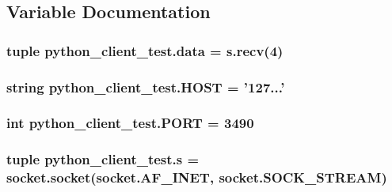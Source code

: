 \subsection{Variable Documentation}
\hypertarget{namespacepython__client__test_a70aa6f62f16d17a2bdf23844fb86b039}{
\subsubsection[{data}]{\setlength{\rightskip}{0pt plus 5cm}tuple python\-\_\-client\-\_\-test.\-data = s.\-recv(4)}}\label{namespacepython__client__test_a70aa6f62f16d17a2bdf23844fb86b039}
\hypertarget{namespacepython__client__test_a92606c7a15210740590acd070e01df55}{
\subsubsection[{H\-O\-S\-T}]{\setlength{\rightskip}{0pt plus 5cm}string python\-\_\-client\-\_\-test.\-H\-O\-S\-T = '127...'}}\label{namespacepython__client__test_a92606c7a15210740590acd070e01df55}
\hypertarget{namespacepython__client__test_ad1345f8ee5062de9e8a7ed7efdf18ac7}{
\subsubsection[{P\-O\-R\-T}]{\setlength{\rightskip}{0pt plus 5cm}int python\-\_\-client\-\_\-test.\-P\-O\-R\-T = 3490}}\label{namespacepython__client__test_ad1345f8ee5062de9e8a7ed7efdf18ac7}
\hypertarget{namespacepython__client__test_afe25ba75e651f13976e71c474188ef96}{
\subsubsection[{s}]{\setlength{\rightskip}{0pt plus 5cm}tuple python\-\_\-client\-\_\-test.\-s = socket.\-socket(socket.\-A\-F\-\_\-\-I\-N\-E\-T, socket.\-S\-O\-C\-K\-\_\-\-S\-T\-R\-E\-A\-M)}}\label{namespacepython__client__test_afe25ba75e651f13976e71c474188ef96}
